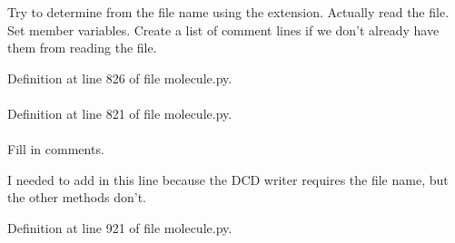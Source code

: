 \-Try to determine from the file name using the extension. \-Actually read the file. \-Set member variables. \-Create a list of comment lines if we don't already have them from reading the file. 

\-Definition at line 826 of file molecule.\-py.

\hypertarget{classforcebalance_1_1molecule_1_1Molecule_a8698f94608be34eeba6eaa4c52dc5249}{
\paragraph[{\-Data}]{}}\label{classforcebalance_1_1molecule_1_1Molecule_a8698f94608be34eeba6eaa4c52dc5249}


\-Definition at line 821 of file molecule.\-py.

\hypertarget{classforcebalance_1_1molecule_1_1Molecule_a7887451529cc2b396240b6e4ebfcc2de}{
\paragraph[{fout}]{}}\label{classforcebalance_1_1molecule_1_1Molecule_a7887451529cc2b396240b6e4ebfcc2de}


\-Fill in comments. 

\-I needed to add in this line because the \-D\-C\-D writer requires the file name, but the other methods don't. 

\-Definition at line 921 of file molecule.\-py.

\hypertarget{classforcebalance_1_1molecule_1_1Molecule_a8ee3f691f4ff9c4236afa756ed5482e3}{
\paragraph[{\-Funnel}]{}}\label{classforcebalance_1_1molecule_1_1Molecule_a8ee3f691f4ff9c4236afa756ed5482e3}


